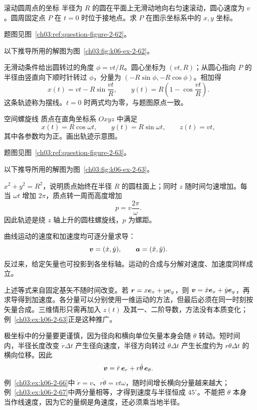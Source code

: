 {\begin{origexamplebox}{滚动圆周点的坐标}\label{ch03:ex:k06-2-62}
半径为 $R$ 的圆在平面上无滑动地向右匀速滚动，圆心速度为 $v$。圆周固定点 $P$ 在 $t=0$ 时位于接地点。求 $P$ 在图示坐标系中的 $x,y$ 坐标。
\par 题图见图~\ref{ch03:ref:question-figure-2-62}。
\KQuestionCK
\end{origexamplebox}
\begin{xesolution}
以下推导所用的解图为图~\ref{ch03:fig:k06-ex-2-62}。

无滑动条件给出圆转过的角度 $\phi=vt/R$。圆心坐标为 $(vt,R)$；从圆心指向 $P$ 的半径由竖直向下顺时针转过 $\phi$，分量为 $(-R\sin\phi,-R\cos\phi)$。相加得
\CycloidDiagram
\[
 \boxed{x(t)=vt-R\sin\frac{vt}{R}},\qquad
 \boxed{y(t)=R\left(1-\cos\frac{vt}{R}\right)}.
\]
这条轨迹称为摆线。$t=0$ 时两式均为零，与题图原点一致。
\end{xesolution}


\begin{origexamplebox}{空间螺旋线}\label{ch03:ex:k06-2-63}
质点在直角坐标系 $Oxyz$ 中满足
\[
x(t)=R\cos\omega t,\qquad y(t)=R\sin\omega t,
\qquad z(t)=vt,
\]
其中各参数均为正。画出轨迹示意图。
\par 题图见图~\ref{ch03:ref:question-figure-2-63}。
\KQuestionCL
\end{origexamplebox}
\begin{xesolution}
以下推导所用的解图为图~\ref{ch03:fig:k06-ex-2-63}。

$x^2+y^2=R^2$，说明质点始终在半径 $R$ 的圆柱面上；同时 $z$ 随时间匀速增加。每当 $\omega t$ 增加 $2\pi$，质点转一周而高度增加
\HelixDiagram
\[
 \boxed{p=v\frac{2\pi}{\omega}}.
\]
因此轨迹是绕 $z$ 轴上升的圆柱螺旋线，$p$ 为螺距。
\end{xesolution}

曲线运动的速度和加速度均可逐分量求导：
\begin{equation}
 \bm{v}=(\dot x,\dot y),\qquad
 \bm{a}=(\ddot x,\ddot y).
\end{equation}
反过来，给定矢量也可投影到各坐标轴。运动的合成与分解对速度、加速度同样成立。

上述等式来自固定基矢不随时间改变。若 $\bm{r}=x\bm{e}_x+y\bm{e}_y$，则 $\bm{v}=\dot x\bm{e}_x+\dot y\bm{e}_y$，再求导得到加速度。各分量可以分别使用一维运动的方法，但最后必须在同一时刻按矢量合成。三维情形只需再加入 $z(t)$ 及其一、二阶导数，方法没有本质变化；例~\ref{ch03:ex:k06-2-63}正是这种推广。

极坐标中的分量要更谨慎，因为径向和横向单位矢量本身会随 $\theta$ 转动。短时间内，半径长度改变 $\dot r\Delta t$ 产生径向速度，半径方向转过 $\dot\theta\Delta t$ 产生长度约为 $r\dot\theta\Delta t$ 的横向位移。因此
\begin{equation}
 \bm{v}=\dot r\,\bm{e}_r+r\dot\theta\,\bm{e}_\theta.
\end{equation}
例~\ref{ch03:ex:k06-2-66}中 $\dot r=v$、$r\dot\theta=vt\omega$，随时间增长横向分量越来越大；例~\ref{ch03:ex:k06-2-67}中两分量相等，才得到速度与半径恒成 $45^\circ$。不能把 $\dot\theta$ 本身当作线速度，因为它的量纲是角速度，还必须乘当地半径。

}
